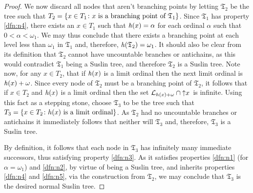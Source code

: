 \begin{proof}
	We now discard all nodes that aren't branching points by letting $\mathfrak{T}_2$ be the tree such that $T_2=\lbrace x\in T_1\colon x\text{ is a branching point of }\mathfrak{T}_1 \rbrace$.  Since $\mathfrak{T}_1$ has property \ref{dfn:n4}, there exists an $x\in T_1$ such that $\mathit{h}(x)=\alpha$ for each ordinal $\alpha$ such that $0<\alpha<\omega_1$.  We may thus conclude that there exists a branching point at each level less than $\omega_1$ in $\mathfrak{T}_1$ and, therefore, $\mathit{h}(\mathfrak{T}_2)=\omega_1$.  It should also be clear from its definition that $\mathfrak{T}_2$ cannot have uncountable branches or antichains, as this would contradict $\mathfrak{T}_1$ being a Suslin tree, and therefore $\mathfrak{T}_2$ is a Suslin tree.  Note now, for any $x\in T_2$, that if $\mathit{h}(x)$ is a limit ordinal then the next limit ordinal is $\mathit{h}(x)+\omega$.  Since every node of $\mathfrak{T}_2$ must be a branching point of $\mathfrak{T}_2$, it follows that if $x\in T_2$ and $\mathit{h}(x)$ is a limit ordinal then the set $\mathcal{L}_{h(x)+\omega}\cap\left\uparrow x\right.$ is infinite.  Using this fact as a stepping stone, choose $\mathfrak{T}_3$ to be the tree such that $T_3=\lbrace x\in T_2\colon h(x)\text{ is a limit ordinal} \rbrace$.  As $\mathfrak{T}_2$ had no uncountable branches or antichains it immediately follows that neither will $\mathfrak{T}_3$ and, therefore, $\mathfrak{T}_3$ is a Suslin tree.

	By definition, it follows that each node in $\mathfrak{T}_3$ has infinitely many immediate successors, thus satisfying property \ref{dfn:n3}.  As it satisfies properties \ref{dfn:n1} (for $\alpha=\omega_1$) and \ref{dfn:n2}, by virtue of being a Suslin tree, and inherits properties \ref{dfn:n4} and \ref{dfn:n5}, via the construction from $\mathfrak{T}_2$, we may conclude that $\mathfrak{T}_3$ is the desired normal Suslin tree.
\end{proof}

